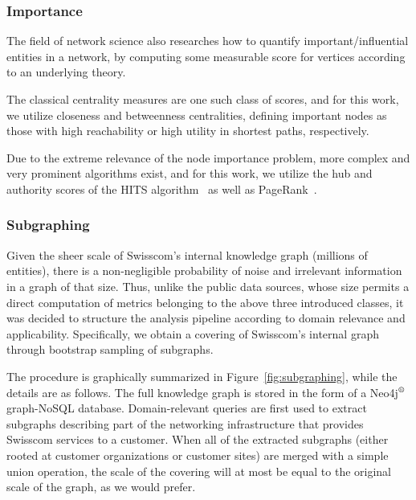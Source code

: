 \subsubsection{Importance}

The field of network science also researches how to quantify important/influential entities in a network, by computing some measurable score for vertices according to an underlying theory.

The classical centrality measures are one such class of scores, and for this work, we utilize closeness and betweenness centralities, defining important nodes as those with high reachability or high utility in shortest paths, respectively.

Due to the extreme relevance of the node importance problem, more complex and very prominent algorithms exist, and for this work, we utilize the hub and authority scores of the HITS algorithm~\cite{kleinberg_authoritative_1999} as well as PageRank~\cite{brin_anatomy_1998}.

\subsubsection{Subgraphing}

Given the sheer scale of Swisscom's internal knowledge graph (millions of entities), there is a non-negligible probability of noise and irrelevant information in a graph of that size. Thus, unlike the public data sources, whose size permits a direct computation of metrics belonging to the above three introduced classes, it was decided to structure the analysis pipeline according to domain relevance and applicability. Specifically, we obtain a covering of Swisscom's internal graph through bootstrap sampling of subgraphs. 

The procedure is graphically summarized in Figure~\ref{fig:subgraphing}, while the details are as follows. The full knowledge graph is stored in the form of a Neo4j$\textsuperscript{\textregistered}$ graph-NoSQL database. Domain-relevant queries are first used to extract subgraphs describing part of the networking infrastructure that provides Swisscom services to a customer. When all of the extracted subgraphs (either rooted at customer organizations or customer sites) are merged with a simple union operation, the scale of the covering will at most be equal to the original scale of the graph, as we would prefer.

